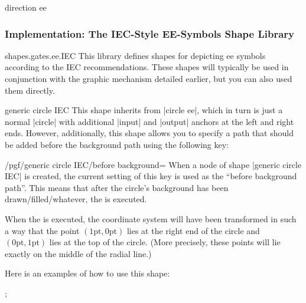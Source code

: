 \begin{shape}{direction ee}
\begin{codeexample}[preamble={\usetikzlibrary{circuits.ee.IEC}}]
\end{codeexample}
\end{shape}


\subsubsection{Implementation: The IEC-Style EE-Symbols Shape Library}

\begin{pgflibrary}{shapes.gates.ee.IEC}
    This library defines shapes for depicting ee symbols according to the IEC
    recommendations. These shapes will typically be used in conjunction with
    the graphic mechanism detailed earlier, but you can also used them
    directly.
\end{pgflibrary}

\begin{shape}{generic circle IEC}
    This shape inherits from |circle ee|, which in turn is just a normal
    |circle| with additional |input| and |output| anchors at the left and right
    ends. However, additionally, this shape allows you to specify a path that
    should be added before the background path using the following key:
    \begin{key}{/pgf/generic circle IEC/before background=}
        When a node of shape |generic circle IEC| is created, the current
        setting of this key is used as the ``before background path''. This
        means that after the circle's background has been
        drawn/filled/whatever, the  is executed.

        When the  is executed, the coordinate system will have been
        transformed in such a way that the point $(1\mathrm{pt},0\mathrm{pt})$
        lies at the right end of the circle and $(0\mathrm{pt},1\mathrm{pt})$
        lies at the top of the circle. (More precisely, these points will lie
        exactly on the middle of the radial line.)
    \end{key}
    Here is an examples of how to use this shape:
\begin{codeexample}[preamble={\usetikzlibrary{circuits.ee.IEC}}]
\tikz {};
\end{codeexample}
\end{shape}

